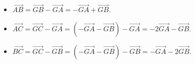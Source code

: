 \begin{vd}
{\begin{enumerate}
		\begin{itemize}
			\item $\overrightarrow{AB} = \overrightarrow{GB} - \overrightarrow{GA} = -\overrightarrow{GA} + \overrightarrow{GB}$.
			\item $\overrightarrow{AC} = \overrightarrow{GC} - \overrightarrow{GA} = (-\overrightarrow{GA} - \overrightarrow{GB}) - \overrightarrow{GA} = -2\overrightarrow{GA} - \overrightarrow{GB}$.
			\item $\overrightarrow{BC} = \overrightarrow{GC} - \overrightarrow{GB} = (-\overrightarrow{GA} - \overrightarrow{GB}) - \overrightarrow{GB} = -\overrightarrow{GA} - 2\overrightarrow{GB}$.
		\end{itemize}
	\end{enumerate}
}
\end{vd} 

